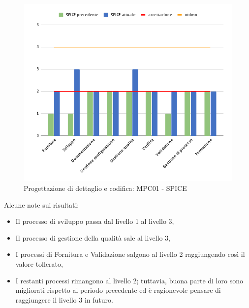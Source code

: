 \begin{figure}[H]
    \centering
    \includegraphics[scale=0.50]{Sezioni/images/pdc-spice.png}
    \caption{Progettazione di dettaglio e codifica: MPC01 - SPICE}
\end{figure}

   Alcune note sui risultati:
\begin{itemize}
\item Il processo di sviluppo passa dal livello 1 al livello 3,
\item Il processo di gestione della qualità sale al livello 3,
\item I processi di Fornitura e Validazione salgono al livello 2 raggiungendo così il valore tollerato,
\item I restanti processi rimangono al livello 2; tuttavia, buona parte di loro sono migliorati rispetto al periodo precedente ed è ragionevole pensare di raggiungere il livello 3 in futuro.
\end{itemize}


